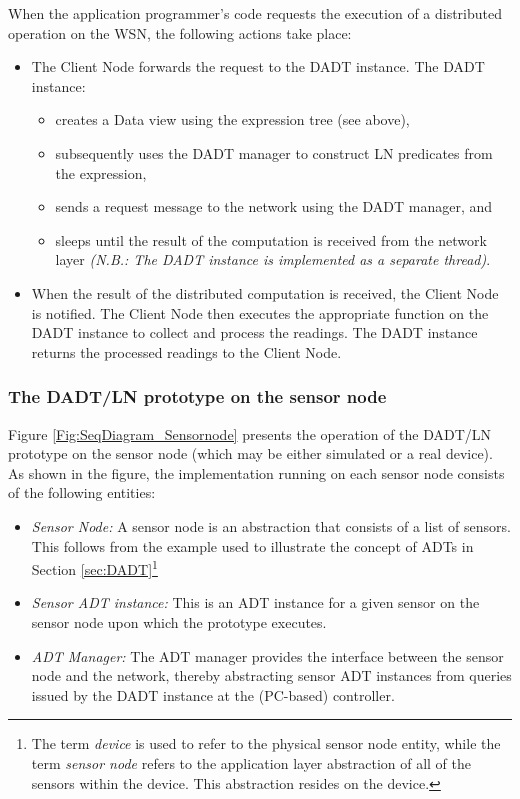 When the application programmer's code requests the execution of a distributed operation
on the WSN, the following actions take place:

\begin{itemize}
  \item The Client Node forwards the request to the DADT instance. The DADT instance:
  \begin{itemize} 
    \item creates a Data
  view using the expression tree (see above),
  \item subsequently uses the DADT 
  manager to construct LN predicates from the expression, 
  \item sends a
  request message to the network using the DADT manager, and
  \item sleeps until the result of the computation is
  received from the network layer \emph{(N.B.: The DADT instance is implemented as a
  separate thread)}.
  \end{itemize}
  \item When the result of the distributed computation is received, the Client Node is notified. 
 The Client Node then executes
  the appropriate function on the DADT instance to collect and process the
  readings. The DADT instance returns the processed readings to the Client Node.
\end{itemize}


\subsubsection{The DADT/LN prototype on the sensor node}

Figure \ref{Fig:SeqDiagram_Sensornode} presents the operation of the DADT/LN
prototype on the sensor node (which may be either simulated or a real
device). As shown in the figure, the implementation running on each sensor node 
consists of the following entities:

\begin{itemize}
  \item \emph{Sensor Node:} A sensor node is an abstraction that consists of a
  list of sensors. This follows from the example used to illustrate the concept
  of ADTs in Section \ref{sec:DADT}\footnote{The term \emph{device} is used to
  refer to the physical sensor node entity, while the term \emph{sensor node}
  refers to the application layer abstraction of all of the sensors within the
  device. This abstraction resides on the device.}
  \item \emph{Sensor ADT instance:} This is an ADT instance for a given sensor
  on the sensor node upon which the prototype executes. 
  \item \emph{ADT Manager:} The ADT manager provides the interface between the
  sensor node and the network, thereby abstracting sensor ADT instances from
  queries issued by the DADT instance at the (PC-based) controller.
\end{itemize}

